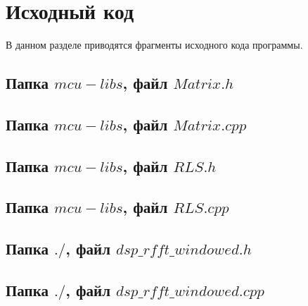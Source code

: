 \documentclass[codelisting]{../espd}
\begin{document}
{\sloppy %
\makelisttitle{\titlemode} %
{
	\cleardoublepage
	
}
{
	\cleardoublepage
	\tableofcontents %
}
%
% 
% 
% 
% 
% 
% 


% 

\newpage\section{Исходный код}

В данном разделе приводятся фрагменты исходного кода программы.

\subsection{Папка $mcu-libs$, файл $Matrix.h$}

\subsection{Папка $mcu-libs$, файл $Matrix.cpp$}

\subsection{Папка $mcu-libs$, файл $RLS.h$}

\subsection{Папка $mcu-libs$, файл $RLS.cpp$}


\subsection{Папка $./$, файл $dsp\_rfft\_windowed.h$}

\subsection{Папка $./$, файл $dsp\_rfft\_windowed.cpp$}

}
\end{document}
